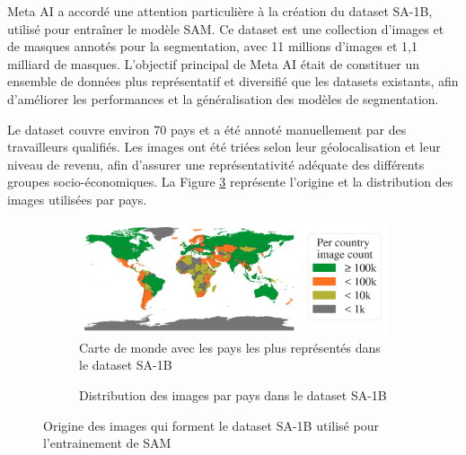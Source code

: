 Meta AI a accordé une attention particulière à la création du dataset SA-1B, utilisé pour entraîner le modèle SAM. Ce dataset est une collection d'images et de masques annotés pour la segmentation, avec 11 millions d'images et 1,1 milliard de masques. L'objectif principal de Meta AI était de constituer un ensemble de données plus représentatif et diversifié que les datasets existants, afin d'améliorer les performances et la généralisation des modèles de segmentation.

Le dataset couvre environ 70 pays et a été annoté manuellement par des travailleurs qualifiés. Les images ont été triées selon leur géolocalisation et leur niveau de revenu, afin d'assurer une représentativité adéquate des différents groupes socio-économiques. La Figure \ref{fig:ch2_sam2_sa1b_diversite_pays} représente l’origine et la distribution des images utilisées par pays.

\begin{figure}[H]
    \centering
    \begin{subfigure}[b]{0.75\textwidth}
        \centering
        \includegraphics[width=\textwidth]{02-main/figures/ch2/ch2_sam2_06_dataset_sa1b_pays1.png}
        \caption{Carte de monde avec les pays les plus représentés dans le dataset SA-1B}
        \label{fig:ch2_sam2_06_dataset_sa1b_pays1}
    \end{subfigure}
    \vspace{0.35cm}
    \begin{subfigure}[b]{1\textwidth}
        \centering
        \caption{Distribution des images par pays dans le dataset SA-1B}
        \label{fig:ch2_sam2_07_dataset_sa1b_pays2}
    \end{subfigure}
    \caption{Origine des images qui forment le dataset SA-1B utilisé pour l’entrainement de SAM \cite{kirillov_segment_2023}}
    \label{fig:ch2_sam2_sa1b_diversite_pays}
\end{figure}

